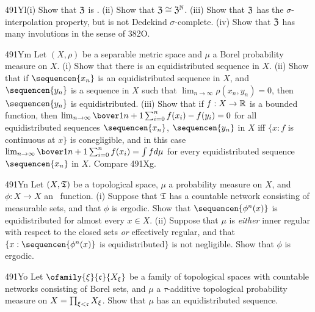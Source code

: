 {\spheader 491Yl(i) Show that $\frak Z$ is \wsid.
(ii) Show that $\frak Z\cong\frak Z^{\Bbb N}$.
(iii) Show that $\frak Z$ has the $\sigma$-interpolation property, but is
not Dedekind $\sigma$-complete.
(iv) Show that $\frak Z$ has many involutions in the sense of 382O.

\spheader 491Ym Let $(X,\rho)$ be a separable metric space and $\mu$ a
Borel probability measure on $X$.   (i) Show that there is an
equidistributed sequence in $X$.
(ii) Show that if $\sequencen{x_n}$ is an equidistributed sequence in
$X$, and $\sequencen{y_n}$ is a sequence in $X$ such that
$\lim_{n\to\infty}\rho(x_n,y_n)=0$, then
$\sequencen{y_n}$ is equidistributed.
(iii) Show that if $f:X\to\Bbb R$ is a bounded function, then
$\lim_{n\to\infty}\bover1{n+1}\sum_{i=0}^nf(x_i)-f(y_i)=0$ for all
equidistributed
sequences $\sequencen{x_n}$, $\sequencen{y_n}$ in $X$ iff
$\{x:f$ is continuous at $x\}$ is conegligible, and in this case
$\lim_{n\to\infty}\bover1{n+1}\sum_{i=0}^nf(x_i)=\int fd\mu$
for every equidistributed sequence $\sequencen{x_n}$ in $X$.
   Compare 491Xg.

\spheader 491Yn Let $(X,\frak T)$ be a topological space, $\mu$ a
probability measure on $X$, and $\phi:X\to X$ an \imp\ function.
(i) Suppose that $\frak T$ has a countable network
consisting of measurable sets, and that $\phi$ is ergodic.   Show that
$\sequencen{\phi^n(x)}$ is equidistributed for almost every $x\in X$.
   (ii)
Suppose that $\mu$ is {\it either} inner regular with respect to the
closed sets {\it or}
effectively regular, and that $\{x:\sequencen{\phi^n(x)}$ is
equidistributed$\}$ is not negligible.   Show that $\phi$ is ergodic.

\spheader 491Yo Let $\ofamily{\xi}{\frak c}{X_{\xi}}$ be a family of
topological spaces with countable networks consisting of Borel sets, and
$\mu$ a $\tau$-additive topological probability measure on
$X=\prod_{\xi<\frak c}X_{\xi}$.   Show that $\mu$ has an equidistributed
sequence.

}
